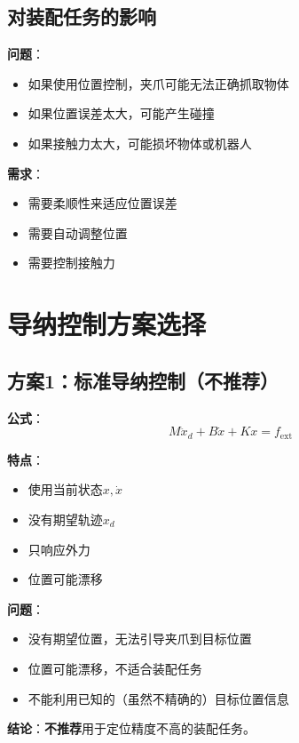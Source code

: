 \documentclass[12pt,a4paper]{article}
\begin{document}
\subsection{对装配任务的影响}

\textbf{问题}：
\begin{itemize}
\item 如果使用位置控制，夹爪可能无法正确抓取物体
\item 如果位置误差太大，可能产生碰撞
\item 如果接触力太大，可能损坏物体或机器人
\end{itemize}

\textbf{需求}：
\begin{itemize}
\item 需要柔顺性来适应位置误差
\item 需要自动调整位置
\item 需要控制接触力
\end{itemize}

\section{导纳控制方案选择}

\subsection{方案1：标准导纳控制（不推荐）}

\textbf{公式}：
\begin{equation}
M\ddot{x}_d + B\dot{x} + Kx = f_{\text{ext}} \tag{11.64}
\end{equation}

\textbf{特点}：
\begin{itemize}
\item 使用当前状态$x, \dot{x}$
\item 没有期望轨迹$x_d$
\item 只响应外力
\item 位置可能漂移
\end{itemize}

\textbf{问题}：
\begin{itemize}
\item 没有期望位置，无法引导夹爪到目标位置
\item 位置可能漂移，不适合装配任务
\item 不能利用已知的（虽然不精确的）目标位置信息
\end{itemize}

\textbf{结论}：\textbf{不推荐}用于定位精度不高的装配任务。
\end{document}
